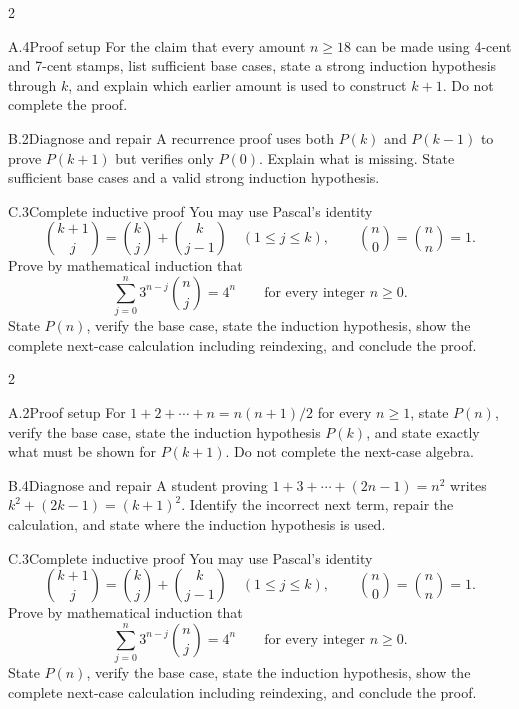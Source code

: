 \documentclass[9pt]{extarticle}
\begin{document}
\CoreWorkArea
\FormBreak
{}
\begin{multicols}{2}
\begin{CompactCoreProblem}{A.4}{Proof setup}
For the claim that every amount $n\ge18$ can be made using 4-cent and 7-cent stamps, list sufficient base cases, state a strong induction hypothesis through $k$, and explain which earlier amount is used to construct $k+1$. Do not complete the proof.
\end{CompactCoreProblem}
\begin{CompactCoreProblem}{B.2}{Diagnose and repair}
A recurrence proof uses both $P(k)$ and $P(k-1)$ to prove $P(k+1)$ but verifies only $P(0)$. Explain what is missing. State sufficient base cases and a valid strong induction hypothesis.
\end{CompactCoreProblem}
\end{multicols}
\begin{CompactCoreProblem}{C.3}{Complete inductive proof}
You may use Pascal's identity
\[
\binom{k+1}{j}=\binom{k}{j}+\binom{k}{j-1}
\quad(1\le j\le k),\qquad
\binom{n}{0}=\binom{n}{n}=1.
\]
Prove by mathematical induction that
\[
\sum_{j=0}^{n} 3^{n-j}\binom{n}{j}=4^n\qquad\text{for every integer }n\ge0.
\]
State $P(n)$, verify the base case, state the induction hypothesis, show the complete next-case calculation including reindexing, and conclude the proof.
\end{CompactCoreProblem}
\CoreWorkArea
\FormBreak
{}
\begin{multicols}{2}
\begin{CompactCoreProblem}{A.2}{Proof setup}
For $1+2+\cdots+n=n(n+1)/2$ for every $n\ge1$, state $P(n)$, verify the base case, state the induction hypothesis $P(k)$, and state exactly what must be shown for $P(k+1)$. Do not complete the next-case algebra.
\end{CompactCoreProblem}
\begin{CompactCoreProblem}{B.4}{Diagnose and repair}
A student proving $1+3+\cdots+(2n-1)=n^2$ writes $k^2+(2k-1)=(k+1)^2$. Identify the incorrect next term, repair the calculation, and state where the induction hypothesis is used.
\end{CompactCoreProblem}
\end{multicols}
\begin{CompactCoreProblem}{C.3}{Complete inductive proof}
You may use Pascal's identity
\[
\binom{k+1}{j}=\binom{k}{j}+\binom{k}{j-1}
\quad(1\le j\le k),\qquad
\binom{n}{0}=\binom{n}{n}=1.
\]
Prove by mathematical induction that
\[
\sum_{j=0}^{n} 3^{n-j}\binom{n}{j}=4^n\qquad\text{for every integer }n\ge0.
\]
State $P(n)$, verify the base case, state the induction hypothesis, show the complete next-case calculation including reindexing, and conclude the proof.
\end{CompactCoreProblem}
\end{document}
